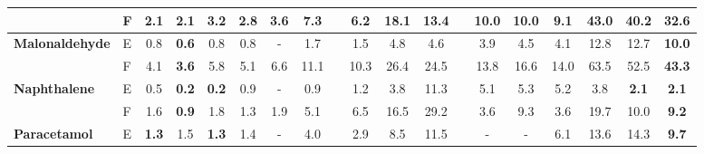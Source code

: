 \documentclass{article}
\begin{document}
\begin{table}
{\begin{tabular}{@{}llcccccccccccc | cc || ccc @{}}
       & F & \textbf{2.1}                                & \textbf{2.1}               & 3.2                                       & 2.8               & 3.6 & 7.3                   &  & 6.2                       & 18.1                     & 13.4                     &  & 10.0                         & 10.0                   & 9.1                           & 43.0              & 40.2                 & \textbf{32.6} \\
      \midrule
      \multirow{2}{*}{\textbf{Malonaldehyde}}
       & E & 0.8                                         & \textbf{0.6}               & 0.8                                       & 0.8               & -   & 1.7                   &  & 1.5                       & 4.8                   & 4.6                      &  & 3.9                          & 4.5                    & 4.1                          & 12.8              & 12.7                 & \textbf{10.0} \\
       & F & 4.1                                         & \textbf{3.6}               & 5.8                                       & 5.1                & 6.6 & 11.1                  &  & 10.3                      & 26.4                     & 24.5                     &  & 13.8                         & 16.6                   & 14.0                          & 63.5             & 52.5                 & \textbf{43.3} \\
      \midrule
      \multirow{2}{*}{\textbf{Naphthalene}}
       & E & 0.5                                         & \textbf{0.2}               & \textbf{0.2}                              & 0.9               & -   & 0.9                   &  & 1.2                       & 3.8                      & 11.3                     &  & 5.1                          & 5.3                    & 5.2                           & 3.8             & \textbf{2.1}         & \textbf{2.1}  \\
       & F & 1.6                                         & \textbf{0.9}                        & 1.8                                       & 1.3        & 1.9 & 5.1                   &  & 6.5                       & 16.5                     & 29.2                     &  & 3.6                          & 9.3                    & 3.6                              & 19.7          & 10.0                 & \textbf{9.2}  \\
      \midrule
      \multirow{2}{*}{\textbf{Paracetamol}}
       & E & \textbf{1.3}                                & 1.5                        & \textbf{1.3}                              & 1.4               &-   & 4.0                   &  & 2.9                       & 8.5                      & 11.5                     &  & -                            & -                      & 6.1                             & 13.6            & 14.3                 & \textbf{9.7}  \\

\end{tabular}}
\end{table}
\end{document}
